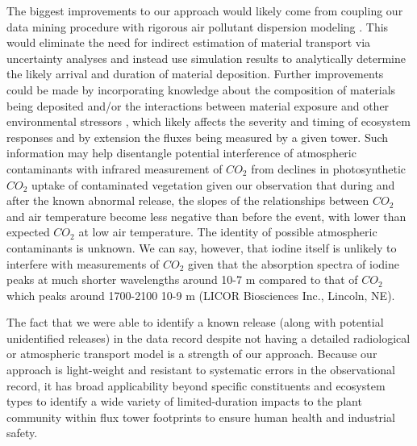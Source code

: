 \documentclass{article}
\begin{document}
The biggest improvements to our approach would likely come from coupling our data mining procedure with rigorous air pollutant dispersion modeling \cite[e.g.,][]{meszarosPredictabilityDispersionFukushimaderived2016}. This would eliminate the need for indirect estimation of material transport via uncertainty analyses and instead use simulation results to analytically determine the likely arrival and duration of material deposition. Further improvements could be made by incorporating knowledge about the composition of materials being deposited \citep{international2006iaea, meszarosPredictabilityDispersionFukushimaderived2016} and/or the interactions between material exposure and other environmental stressors \citep{mousseauPlantsLightIonizing2020}, which likely affects the severity and timing of ecosystem responses and by extension the fluxes being measured by a given tower. Such information may help disentangle potential interference of atmospheric contaminants with infrared measurement of $CO_2$ from declines in photosynthetic $CO_2$ uptake of contaminated vegetation given our observation that during and after the known abnormal release, the slopes of the relationships between $CO_2$ and air temperature become less negative than before the event, with lower than expected $CO_2$ at low air temperature. The identity of possible atmospheric contaminants is unknown. We can say, however, that iodine itself is unlikely to interfere with measurements of $CO_2$ given that the absorption spectra of iodine peaks at much shorter wavelengths around 10-7 m \citep{haynes2016crc} compared to that of $CO_2$ which peaks around 1700-2100 10-9 m (LICOR Biosciences Inc., Lincoln, NE).

The fact that we were able to identify a known release (along with potential unidentified releases) in the data record despite not having a detailed radiological or atmospheric transport model is a strength of our approach. Because our approach is light-weight and resistant to systematic errors in the observational record, it has broad applicability beyond specific constituents and ecosystem types to identify a wide variety of limited-duration impacts to the plant community within flux tower footprints to ensure human health and industrial safety.


\end{document}
